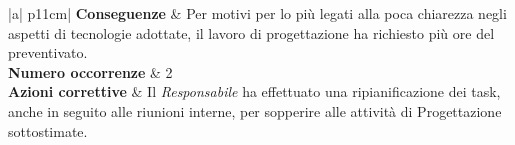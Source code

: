 \begin{table}[H]
	\begin{center}
		\begin{tabular}{|a| p{11cm}|}
			\hline
			\textbf{Conseguenze}	& Per motivi per lo più legati alla poca chiarezza negli aspetti di tecnologie
			adottate, il lavoro di progettazione ha richiesto più ore del preventivato. \\
			\hline
			\textbf{Numero occorrenze} & 2 \\
			\hline
			\textbf{Azioni correttive}	&	Il \textit{Responsabile} ha effettuato una ripianificazione dei task, anche in seguito alle riunioni interne, per sopperire alle attività di Progettazione sottostimate.\\
			\hline
		\end{tabular}
		\caption{Tabella relativa alla mitigazione dei rischi per stime e previsioni}
	\end{center}
\end{table}


